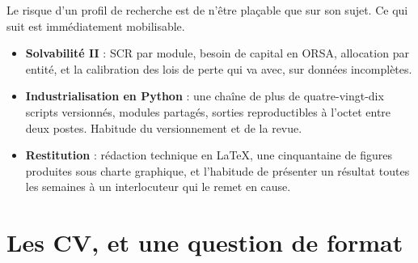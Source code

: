 \documentclass[11pt,a4paper]{article}
\begin{document}
\noindent Le risque d'un profil de recherche est de n'être plaçable que sur son sujet. Ce
qui suit est immédiatement mobilisable.

\begin{itemize}
\item \textbf{Solvabilité II} : SCR par module, besoin de capital en ORSA, allocation par
      entité, et la calibration des lois de perte qui va avec, sur données incomplètes.
\item \textbf{Industrialisation en Python} : une chaîne de plus de quatre-vingt-dix scripts
      versionnés, modules partagés, sorties reproductibles à l'octet entre deux postes.
      Habitude du versionnement et de la revue.
\item \textbf{Restitution} : rédaction technique en \LaTeX{}, une cinquantaine de figures
      produites sous charte graphique, et l'habitude de présenter un résultat toutes les
      semaines à un interlocuteur qui le remet en cause.
\end{itemize}

%

\section{Les CV, et une question de format}
\end{document}
